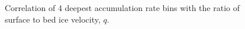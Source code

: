 \begin{figure}[ht]
\centering
{}
\caption[]{Correlation of 4 deepest accumulation rate bins with the ratio of surface to bed ice velocity, $q$.}
\label{fig:accumCorrelation}
\end{figure}




 